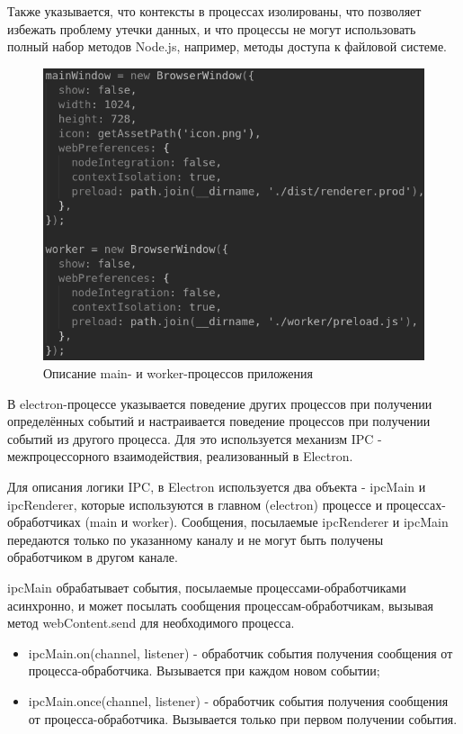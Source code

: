 Также указывается, что контексты в процессах изолированы, что позволяет избежать проблему утечки данных, и что процессы не могут использовать полный набор методов Node.js, например, методы доступа к файловой системе.

\begin{figure}[H]
  \centering
  \includegraphics[height=0.3\textheight]{assets/images/practical/main+worker.png}
  \caption{Описание main- и worker-процессов приложения}
  \label{img:mainWorker}
\end{figure}

В electron-процессе указывается поведение других процессов при получении определённых событий и настраивается поведение процессов при получении событий из другого процесса. Для это используется механизм IPC - межпроцессорного взаимодействия, реализованный в Electron.

Для описания логики IPC, в Electron используется два объекта - ipcMain и ipcRenderer, которые используются в главном (electron) процессе и процессах-обработчиках (main и worker). Сообщения, посылаемые ipcRenderer и  ipcMain передаются только по указанному каналу и не могут быть получены обработчиком в другом канале.

ipcMain обрабатывает события, посылаемые процессами-обработчиками асинхронно, и может посылать сообщения процессам-обработчикам, вызывая метод webContent.send для необходимого процесса.

\begin{itemize}
  \item ipcMain.on(channel, listener) - обработчик события получения сообщения от процесса-обработчика. Вызывается при каждом новом событии;
  \item ipcMain.once(channel, listener) - обработчик события получения сообщения от процесса-обработчика. Вызывается только при первом получении события.
\end{itemize}


